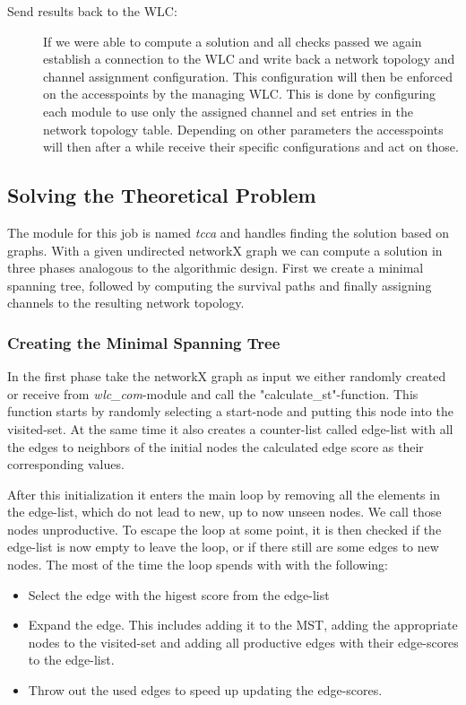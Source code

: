 \begin{description}
	\item [Send results back to the WLC:]
	  If we were able to compute a solution and all checks passed we again establish a connection to the WLC and write back a network topology and channel assignment
	  configuration. This configuration will then be enforced on the accesspoints by the managing WLC.
	  This is done by configuring each module to use only the assigned channel and set entries in the network topology table. Depending on other parameters the
	  accesspoints will then after a while receive their specific configurations and act on those.
      \end{description}
      
      \clearpage
      \newpage
      
    \subsection{Solving the Theoretical Problem}
      The module for this job is named \textit{tcca} and handles finding the solution based on graphs.
      With a given undirected networkX graph we can compute a solution in three phases analogous to the algorithmic design.
      First we create a minimal spanning tree, followed by computing the survival paths and finally assigning channels to the resulting network topology.

      \subsubsection{Creating the Minimal Spanning Tree}
	In the first phase take the networkX graph as input we either randomly created or receive from \textit{wlc\_com}-module and call the "calculate\_st"-function.
	This function starts by randomly selecting a start-node and putting this node into the visited-set. At the same time it also creates a counter-list
	called edge-list with all the edges to neighbors of the initial nodes the calculated edge score as their corresponding values.
	
	After this initialization it enters the main loop by removing all the elements in the edge-list, which do not lead to new, up to now unseen nodes. 
	We call those nodes unproductive.
	To escape the loop at some point, it is then checked if the edge-list is now empty to leave the loop, or if there still are some edges to new nodes.
	The most of the time the loop spends with with the following:
	
	\begin{itemize}
	 \item Select the edge with the higest score from the edge-list
	 
	 \item Expand the edge. This includes adding it to the MST, adding the appropriate nodes to the visited-set and adding all productive edges with their edge-scores to the edge-list.
	 
	 \item Throw out the used edges to speed up updating the edge-scores.
	\end{itemize}
	
